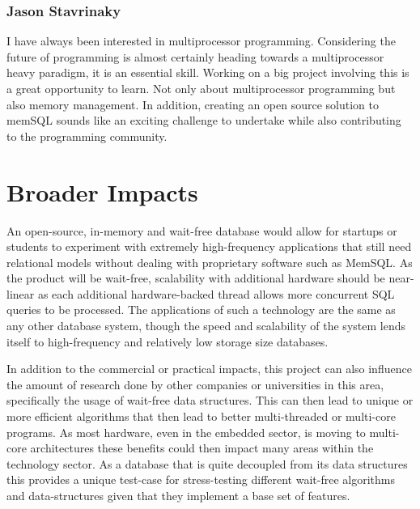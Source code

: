 \documentclass[letterpaper, 12pt]{article}
\begin{document}
\subsubsection{Jason Stavrinaky}
I have always been interested in multiprocessor programming.  Considering the
future  of  programming  is  almost  certainly  heading  towards  a  multiprocessor
heavy paradigm, it is an essential skill.  Working on a big project involving this
is a great opportunity to learn.  Not only about multiprocessor programming
but also memory management.  In addition, creating an open source solution to
memSQL sounds like an exciting challenge to undertake while also contributing
to the programming community.

\newpage

\section{Broader Impacts}
An open-source, in-memory and wait-free database would allow for startups or students to 
experiment with extremely high-frequency applications that still need relational 
models without dealing with proprietary software such as MemSQL. As the product 
will be wait-free, scalability with additional hardware should be near-linear as each 
additional hardware-backed thread allows more concurrent SQL queries to be processed. 
The applications of such a technology are the same as any other database system, 
though the speed and scalability of the system lends itself to high-frequency and 
relatively low storage size databases.
\par\vspace{\baselineskip}
In addition to the commercial or practical impacts, this project can also influence the
amount of research done by other companies or universities in this area, specifically the
usage of wait-free data structures. This can then lead to unique or more efficient
algorithms that then lead to better multi-threaded or multi-core programs. As most hardware,
even in the embedded sector, is moving to multi-core architectures these benefits could
then impact many areas within the technology sector. As a database that is quite decoupled 
from its data structures this provides a unique test-case for stress-testing different wait-free
algorithms and data-structures given that they implement a base set of features.
\newpage
\end{document}
